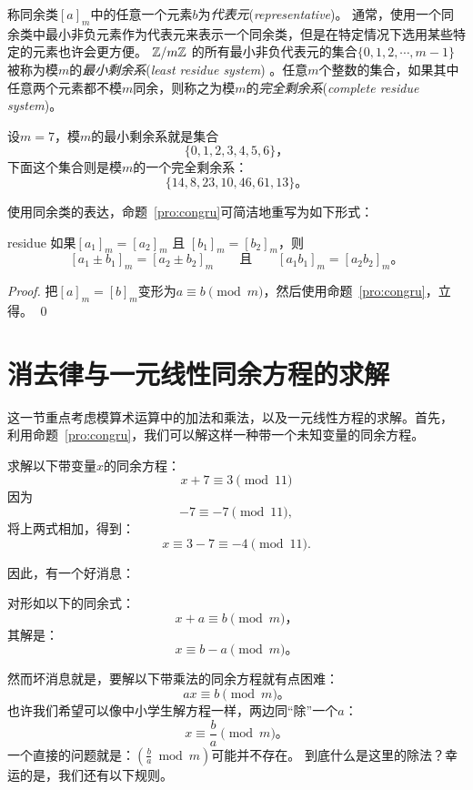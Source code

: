 称同余类$[a]_m$中的任意一个元素$b$为\emph{代表元}(\emph{representative})。
通常，使用一个同余类中最小非负元素作为代表元来表示一个同余类，但是在特定情况下选用某些特定的元素也许会更方便。
${\mathbb Z}/m{\mathbb Z}$ 的所有最小非负代表元的集合$\{0, 1, 2,\cdots, m - 1 \}$被称为模$m$的\emph{最小剩余系}(\emph{least residue system}) 。任意$m$个整数的集合，如果其中任意两个元素都不模$m$同余，则称之为模$m$的\emph{完全剩余系}(\emph{complete residue system})。

\begin{example}
设$m = 7$，模$m$的最小剩余系就是集合 
\[\{0, 1, 2, 3, 4, 5, 6 \}\text{，}\]
下面这个集合则是模$m$的一个完全剩余系： 
\[\{14, 8, 23, 10, 46, 61, 13\}\text{。}\]
\end{example}

使用同余类的表达，命题~\ref{pro:congru}可简洁地重写为如下形式：
\begin{proposition}{}{residue}
如果$[a_1]_m = [a_2]_m$ 且 $[b_1]_m = [b_2]_m$，则
\[[a_1 \pm b_1]_m = [a_2 \pm b_2]_m \qquad \text{且}\qquad
[a_1 b_1]_m = [a_2 b_2]_m \text{。}\]
\end{proposition}

\begin{proof}
把$[a]_m = [b]_m$变形为$a \equiv b \pmod{m}$，然后使用命题~\ref{pro:congru}，立得。 \qed
\end{proof}

\section{消去律与一元线性同余方程的求解}
这一节重点考虑模算术运算中的加法和乘法，以及一元线性方程的求解。首先，
利用命题~\ref{pro:congru}，我们可以解这样一种带一个未知变量的同余方程。
\begin{example}
求解以下带变量$x$的同余方程：
 \[x + 7 \equiv 3 \pmod{11}\]
因为\[ -7 \equiv -7 \pmod{11},\]
将上两式相加，得到：
 \[x \equiv 3 - 7 \equiv -4 \pmod{11}.\]
\end{example}

因此，有一个好消息：
	\begin{center}
	\begin{tcolorbox}[colback=green!5!white, colframe=red!75!black,width = 10cm]
对形如以下的同余式：
\[ x + a \equiv b \pmod{m}\text{，}\]
其解是：
\[ x \equiv b - a \pmod{m}\text{。}\]
	\end{tcolorbox}
	\end{center}
然而坏消息就是，要解以下带乘法的同余方程就有点困难： 
\[ ax \equiv b \pmod{m}\text{。}\]
也许我们希望可以像中小学生解方程一样，两边同“除”一个$a$：
\[ x \equiv \frac{b}{a} \pmod{m}\text{。}\]
一个直接的问题就是：$(\frac{b}{a} \bmod m)$可能并不存在。
到底什么是这里的除法？幸运的是，我们还有以下规则。

